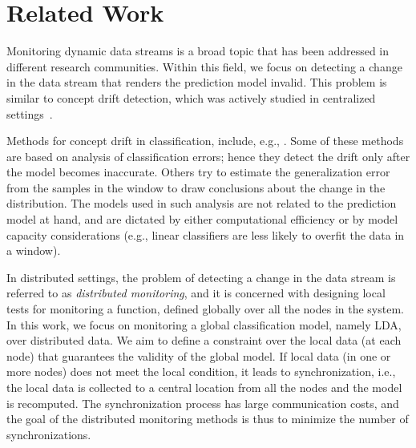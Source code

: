 \section{Related Work}
Monitoring dynamic data streams is a broad topic that has been addressed in different research communities. Within this field, we focus on detecting a change in the data stream that renders the prediction model invalid. This problem is similar to concept drift detection, which was actively studied in centralized settings~\cite{basseville1993detection,brodsky2013nonparametric,ChenGupta2000,Tsymbal,Gama2014}.

Methods for concept drift in classification, include, e.g., \cite{gama2004learning,baena2006early,klinkenberg2000detecting,dries2009adaptive,icml2014c2_harel14,AngGZPH13}. Some of these methods~\cite{gama2004learning,baena2006early,klinkenberg2000detecting} are based on analysis of classification errors; hence they detect the drift only after the model becomes inaccurate. Others \cite{klinkenberg2000detecting,dries2009adaptive} try to estimate the generalization error from the samples in the window to draw conclusions about the change in the distribution. The models used in such analysis are not related to the prediction model at hand, and are dictated by either computational efficiency \cite{klinkenberg2000detecting} or by model capacity considerations (e.g., linear classifiers are less likely to overfit the data in a window)\cite{dries2009adaptive}. 


In distributed settings, the problem of detecting a change in the data stream is referred to as {\em distributed monitoring}, and it is concerned with designing local tests for monitoring a function, defined globally over all the nodes in the system.
In this work, we focus on monitoring a global classification model, namely LDA, over distributed data.
We aim to define a constraint over the local data (at each node) that guarantees the validity of the global model. If local data (in one or more nodes) does not meet the local condition, it leads to synchronization, i.e., the local data is collected to a central location from all the nodes and the model is recomputed.
The synchronization process has large communication costs, and the goal of the distributed monitoring methods is thus to minimize the number of synchronizations.

